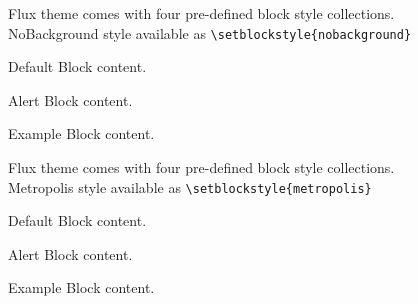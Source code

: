 \documentclass[9pt,aspectratio=169]{ctexbeamer}
\begin{document}
\begin{frame}[fragile]{\secname}{\subsecname}
  		Flux theme comes with four pre-defined block style collections.\\
  		NoBackground style available as \verb+\setblockstyle{nobackground}+\\[0.5cm]
  
   \centering
	\begin{minipage}[b]{0.5\textwidth}

	  \begin{block}{Default}
        Block content.
    \end{block}

    \begin{alertblock}{Alert}
      Block content.
    \end{alertblock}

    \begin{exampleblock}{Example}
      Block content.
    \end{exampleblock}       
      
	\end{minipage}
	
\end{frame}

\begin{frame}[fragile]{\secname}{\subsecname}
  		Flux theme comes with four pre-defined block style collections.\\
  		Metropolis style available as \verb+\setblockstyle{metropolis}+\\[0.5cm]
  
   \centering
	\begin{minipage}[b]{0.5\textwidth}

	  \begin{block}{Default}
        Block content.
      \end{block}

      \begin{alertblock}{Alert}
        Block content.
      \end{alertblock}

      \begin{exampleblock}{Example}
        Block content.
      \end{exampleblock}      
      
	\end{minipage}
	
\end{frame}
\end{document}
